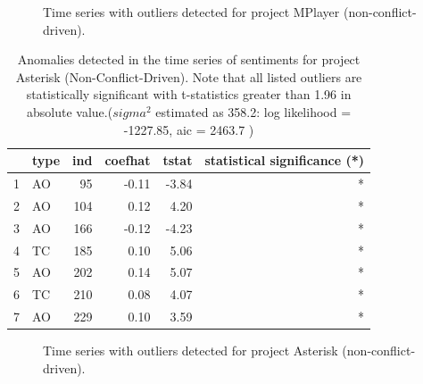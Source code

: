 \documentclass[12pt,letterpaper]{gthesis2}  %
\begin{document}
\begin{figure} [!htbp]
\centering
{}
\caption{Time series with outliers detected for project MPlayer (non-conflict-driven).}
\label{figureOutliers_6}
\end{figure}

\pagebreak

\begin{table} [!htbp]
\centering
\caption{Anomalies detected in the time series of sentiments for project Asterisk (Non-Conflict-Driven). Note that all listed outliers are statistically significant with t-statistics greater than 1.96 in absolute value.($sigma^2$ estimated as 358.2:  log likelihood = -1227.85,  aic = 2463.7
  )}
\begin{tabular}{rlrrrr}
  \hline
 & type & ind & coefhat & tstat & statistical significance (*)\\ 
  \hline
1 & AO &  95 & -0.11 & -3.84 & * \\ 
  2 & AO & 104 & 0.12 & 4.20  & *\\ 
  3 & AO & 166 & -0.12 & -4.23 & * \\ 
  4 & TC & 185 & 0.10 & 5.06  & *\\ 
  5 & AO & 202 & 0.14 & 5.07  & *\\ 
  6 & TC & 210 & 0.08 & 4.07  & *\\ 
  7 & AO & 229 & 0.10 & 3.59  & *\\ 
   \hline
\end{tabular}
\end{table}

\begin{figure} [!htbp]
\centering
{}
\caption{Time series with outliers detected for project Asterisk (non-conflict-driven).}
\label{figureOutliers_7}
\end{figure}

\pagebreak

%
\end{document}
